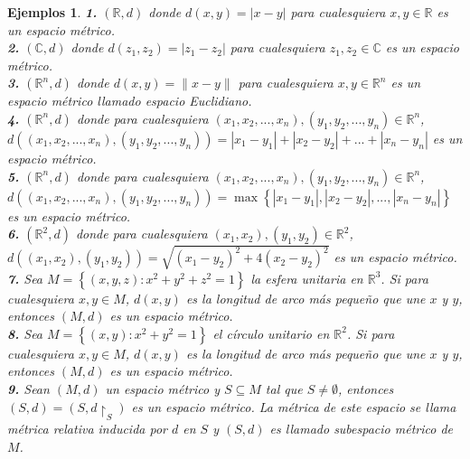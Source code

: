\documentclass[oneside]{book} %
\theoremstyle{Teorema}
\theoremstyle{Ejemplos}
\newtheorem{Ejemplos}[Definicion]{Ejemplos}
\theoremstyle{[Obs]}
\newcommand{\abs}[1]{\left|#1\right|} %
\newcommand{\norm}[1]{\lVert#1\rVert} %
\renewcommand{\{}{\left\lbrace} %
\renewcommand{\}}{\right\rbrace} %
\renewcommand{\sc}{\subseteq} %
\newcommand{\R}{\mathbb{R}} %
\newcommand{\C}{\mathbb{C}} %
\newcommand{\Rn}{\mathbb{R}^n} %
\newcommand{\Ri}[1]{\mathbb{R}^{#1}} %
\begin{document}
			\begin{Ejemplos}

				\hfill

				\textbf{1.} $(\R, d)$ donde $d(x, y) = \abs{x - y}$ para cualesquiera $x, y \in \R$ es un espacio métrico. \\
				
				\textbf{2.} $(\C, d)$ donde $d(z_1, z_2) = \abs{z_1 - z_2}$ para cualesquiera $z_1, z_2 \in \C$ es un espacio métrico. \\
				
				\textbf{3.} $(\Rn, d)$ donde $d(x, y) = \norm{x - y}$ para cualesquiera $x, y \in \Rn$ es un espacio métrico llamado espacio Euclidiano. \\
				
				\textbf{4.} $(\Rn, d)$ donde para cualesquiera $(x_1, x_2, ..., x_n), (y_1, y_2, ..., y_n) \in \Rn$, $d( (x_1, x_2, ..., x_n), (y_1, y_2, ..., y_n) ) = \abs{x_1 - y_1} + \abs{x_2 - y_2} + ... + \abs{x_n - y_n}$ es un espacio métrico. \\
				
				\textbf{5.} $(\Rn, d)$ donde para cualesquiera $(x_1, x_2, ..., x_n), (y_1, y_2, ..., y_n) \in \Rn$, $d( (x_1, x_2, ..., x_n), (y_1, y_2, ..., y_n) ) = \max\{ \abs{x_1 - y_1}, \abs{x_2 - y_2}, ..., \abs{x_n - y_n} \}$ es un espacio métrico. \\

				\textbf{6.} $(\Ri{2}, d)$ donde para cualesquiera $(x_1, x_2), (y_1, y_2) \in \Ri{2}$, $d((x_1, x_2), (y_1, y_2)) = \sqrt{(x_1 - y_2)^2 + 4(x_2 - y_2)^2}$ es un espacio métrico. \\

				\textbf{7.} Sea $M = \{ (x, y, z) : x^2 + y^2 + z^2 = 1 \}$ la esfera unitaria en $\Ri{3}$. Si para cualesquiera $x, y \in M$, $d(x, y)$ es la longitud de arco más pequeño que une $x$ y $y$, entonces $(M, d)$ es un espacio métrico. \\

				\textbf{8.} Sea $M = \{ (x, y) : x^2 + y^2 = 1 \}$ el círculo unitario en $\Ri{2}$. Si para cualesquiera $x, y \in M$, $d(x, y)$ es la longitud de arco más pequeño que une $x$ y $y$, entonces $(M, d)$ es un espacio métrico. \\

				\textbf{9.} Sean $(M, d)$ un espacio métrico y $S \sc M$ tal que $S \neq \emptyset$, entonces $(S, d) = (S, d\restriction_{S})$ es un espacio métrico. La métrica de este espacio se llama métrica relativa inducida por $d$ en $S$ y $(S, d)$ es llamado subespacio métrico de $M$. \\


\end{Ejemplos}
\end{document}
